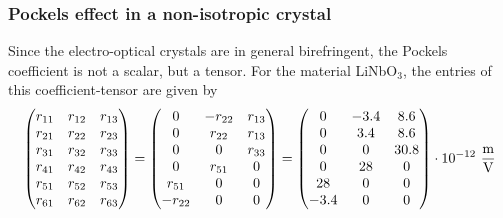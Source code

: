 \subsubsection{Pockels effect in a non-isotropic crystal}
Since the electro-optical crystals are in general birefringent, the
Pockels coefficient is not a scalar, but a tensor. For the material
LiNbO$_3$, the entries of this coefficient-tensor are given by
$$\begin{pmatrix}
    r_{11} & r_{12} & r_{13} \\
    r_{21} & r_{22} & r_{23} \\
    r_{31} & r_{32} & r_{33} \\
    r_{41} & r_{42} & r_{43} \\
    r_{51} & r_{52} & r_{53} \\
    r_{61} & r_{62} & r_{63}
\end{pmatrix}=\begin{pmatrix}
    0 & -r_{22} & r_{13} \\
    0 & r_{22} & r_{13} \\
    0 & 0 & r_{33} \\
    0 & r_{51} & 0 \\
    r_{51} & 0 & 0 \\
    -r_{22} & 0 & 0 \\
\end{pmatrix}=\begin{pmatrix}
    0 & -3.4 & 8.6 \\
    0 & 3.4 & 8.6 \\
    0 & 0 & 30.8 \\
    0 & 28 & 0 \\
    28 & 0 & 0 \\
    -3.4 & 0 & 0
\end{pmatrix}\cdot 10^{-12}\ \frac{\textnormal{m}}{\textnormal{V}}$$


\newpage
